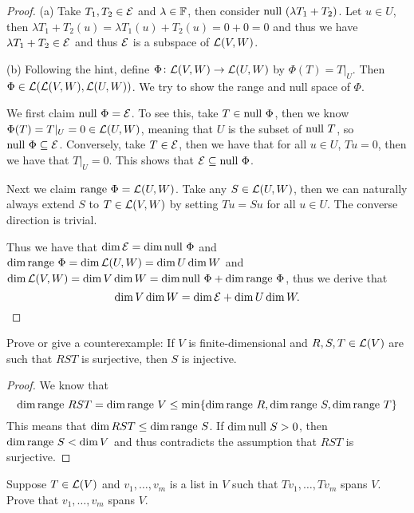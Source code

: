 \documentclass{extarticle}
\begin{document}
\begin{proof}
(a) Take \(T_1, T_2 \in \mathcal{E}\) and \(\lambda \in \mathbb{F}\), then consider \(\text{null }(\lambda T_1 + T_2)\). Let 
\(u \in U\), then \(\lambda T_1 + T_2 (u) = \lambda T_1 (u) + T_2 (u) = 0 + 0 = 0\) and thus we have 
\(\lambda T_1 + T_2  \in \mathcal{E}\) and thus \(\mathcal{E}\) is a subspace of \(\mathcal{L}(V, W)\). 

(b) Following the hint, define \(\Phi \colon \mathcal{L}(V, W) \to \mathcal{L}(U, W)\) by \(\Phi(T) = T |_U\). Then 
\(\Phi \in \mathcal{L}(\mathcal{L}(V, W), \mathcal{L}(U, W))\). We try to show the range and null space of \(\Phi\). 

We first 
claim \(\text{null } \Phi = \mathcal{E}\). To see this, take \(T \in \text{null } \Phi\), then we know \(\Phi(T) 
= T |_U = 0 \in \mathcal{L}(U, W)\), meaning that \(U\) is the subset of \(\text{null } T\), so \(\text{null } \Phi \subseteq \mathcal{E} \). 
Conversely, take \(T \in \mathcal{E}\), then we have that for all \(u \in U\), \(Tu = 0\), then we have that 
\(T |_U = 0\). This shows that \(\mathcal{E} \subseteq \text{null } \Phi\). 

Next we claim \(\text{range } \Phi = \mathcal{L}(U, W)\). Take any \(S \in \mathcal{L}(U, W)\), then we can naturally always extend 
\(S\) to \(T \in \mathcal{L}(V, W)\) by setting \(T u = S u\) for all \(u \in U\). The converse direction is trivial. 

Thus we have that \(\dim \mathcal{E} = \dim \text{null } \Phi\) and \(\dim \text{range } \Phi = \dim \mathcal{L}(U, W) = \dim U \dim W\)
and \(\dim \mathcal{L}(V, W) = \dim V \dim W = \dim \text{null } \Phi + \dim \text{range } \Phi\), thus we derive that 
\[\dim V \dim W = \dim \mathcal{E} + \dim U \dim W.\]

\end{proof}



\begin{problem}{14}
    Prove or give a counterexample: If \(V\) is finite-dimensional and \(R, S, T \in \mathcal{L}(V)\) are such 
    that \(RST\) is surjective, then \(S\) is injective. 
\end{problem}


\begin{proof}
We know that \[\dim \text{range } RST = \dim \text{range } V \leq \min \{\dim \text{range } R, \dim \text{range } S, \dim \text{range } T\} \]
This means that \(\dim RST \leq \dim \text{range } S\).
If \(\dim \text{null } S > 0\), then \(\dim \text{range } S < \dim V\) and thus 
contradicts the assumption that \(RST\) is surjective. 
\end{proof}

\begin{problem}{15}
    Suppose \(T \in \mathcal{L}(V)\) and \(v_1, \ldots, v_m\) is a list in \(V\) such that \(T v_1, \ldots, T v_m\)
    spans \(V\). Prove that \(v_1, \ldots, v_m\) spans \(V\). 
\end{problem}
\end{document}
